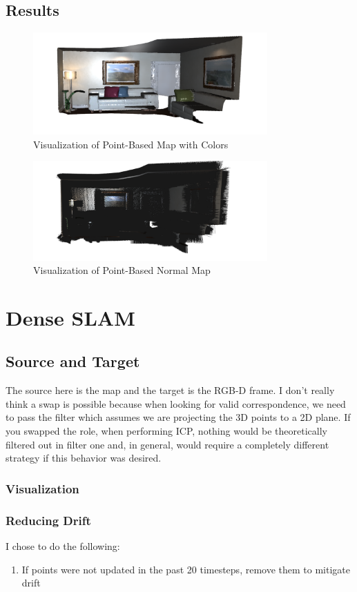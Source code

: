 \documentclass[12pt, a4paper]{article}
\begin{document}
\subsection{Results}
\begin{figure}[!htb]
    \centering
    \includegraphics[width=0.8\textwidth]{FusionVis.PNG}
    \caption{Visualization of Point-Based Map with Colors}
\end{figure}
\begin{figure}[!htb]
    \centering
    \includegraphics[width=0.8\textwidth]{NormalMap.PNG}
    \caption{Visualization of Point-Based Normal Map}
\end{figure}

\clearpage
\section{Dense SLAM}
\subsection{Source and Target}
The source here is the map and the target is the RGB-D frame. I don't really think a swap is possible because when looking for valid correspondence, we need to pass the filter which assumes we are projecting the 3D points to a 2D plane. If you swapped the role, when performing ICP, nothing would be theoretically filtered out in filter one and, in general, would require a completely different strategy if this behavior was desired.

\subsubsection{Visualization}

\subsubsection{Reducing Drift}
I chose to do the following:
\begin{enumerate}
    \item If points were not updated in the past 20 timesteps, remove them to mitigate drift
\end{enumerate}
\end{document}
